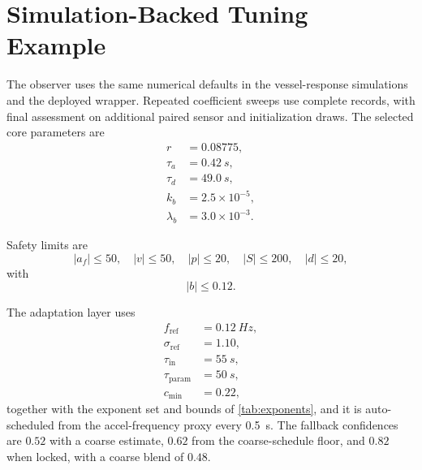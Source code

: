 \documentclass[conference]{IEEEtran}
\begin{document}
    \section{Simulation-Backed Tuning Example}\label{sec:tuning}

    The observer uses the same numerical defaults in the vessel-response
    simulations and the deployed wrapper. Repeated coefficient sweeps use
    complete records, with final assessment on additional paired sensor and
    initialization draws. The selected core parameters are
    \begin{align}
        r &= 0.08775,\\
        \tau_a &= 0.42~\si{s},\\
        \tau_d &= 49.0~\si{s},\\
        k_b &= 2.5\times10^{-5},\\
        \lambda_b &= 3.0\times10^{-3}.
    \end{align}

    Safety limits are
    \begin{equation}
        |a_f|\le 50,\quad |v|\le 50,\quad |p|\le 20,\quad |S|\le 200,\quad |d|\le 20,
    \end{equation}
    with
    \begin{equation}
        |b|\le 0.12.
    \end{equation}

    The adaptation layer uses
    \begin{align}
        f_{\mathrm{ref}} &= 0.12~\si{Hz},\\
        \sigma_{\mathrm{ref}} &= 1.10,\\
        \tau_{\mathrm{in}} &= 55~\si{s},\\
        \tau_{\mathrm{param}} &= 50~\si{s},\\
        c_{\min} &= 0.22,
    \end{align}
    together with the exponent set and bounds of \cref{tab:exponents}, and it is
    auto-scheduled from the accel-frequency proxy every \SI{0.5}{s}. The
    fallback confidences are \(0.52\) with a coarse estimate, \(0.62\) from the
    coarse-schedule floor, and \(0.82\) when locked, with a coarse blend of
    \(0.48\).
\end{document}
